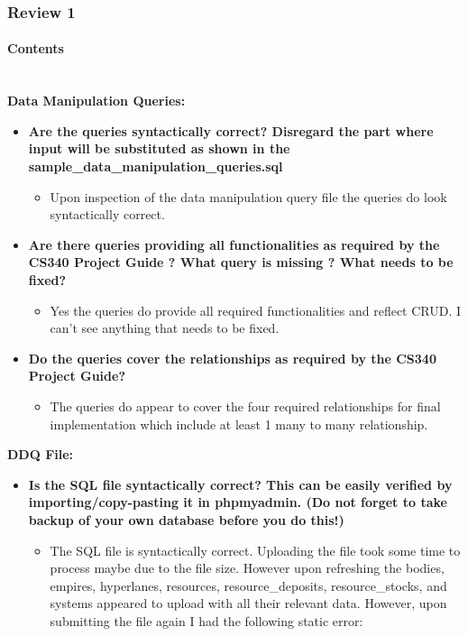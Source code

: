 \documentclass[12pt]{article}
\newcommand{\hparagraph}[1]{\paragraph{#1}\mbox{}\vspace{0.75em}\\}
\begin{document}
\begin{appendices}
\subsubsection{Review 1}
\hparagraph{Contents}
\textbf{Data Manipulation Queries:}
\begin{itemize}
    \item \textbf{Are the queries syntactically correct? Disregard the part where input will be substituted as shown in the sample\_data\_manipulation\_queries.sql}
    \begin{itemize}
        \item Upon inspection of the data manipulation query file the queries do look syntactically correct.
    \end{itemize}
    \item \textbf{Are there queries providing all functionalities as required by the CS340 Project Guide ? What query is missing ? What needs to be fixed?}
    \begin{itemize}
        \item Yes the queries do provide all required functionalities and reflect CRUD. I can’t see anything that needs to be fixed.
    \end{itemize}
    \item \textbf{Do the queries cover the relationships as required by the CS340 Project Guide?}
    \begin{itemize}
        \item The queries do appear to cover the four required relationships for final implementation which include at least 1 many to many relationship.
    \end{itemize}
\end{itemize}
\textbf{DDQ File:}
\begin{itemize}
    \item \textbf{Is the SQL file syntactically correct? This can be easily verified by importing/copy-pasting it in phpmyadmin. (Do not forget to take backup of your own database before you do this!)}
    \begin{itemize}
        \item The SQL file is syntactically correct. Uploading the file took some time to process maybe due to the file size. However upon refreshing the bodies, empires, hyperlanes, resources, resource\_deposits, resource\_stocks, and systems appeared to upload with all their relevant data. However, upon submitting the file again I had the following static error:
        

\end{itemize}
\end{itemize}
\end{appendices}
\end{document}
